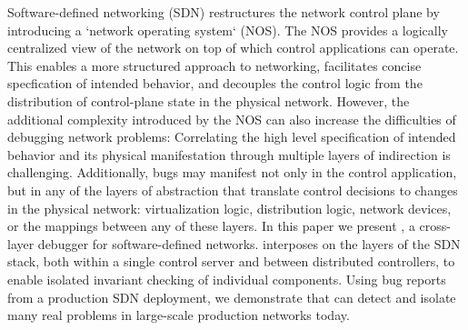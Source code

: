 Software-defined networking (SDN) restructures the network control plane
by introducing a `network operating system` (NOS). The NOS provides
a logically centralized view of the network on top of which control
applications can operate. This enables a more structured approach to
networking, facilitates concise specfication of intended behavior,
and decouples the control logic from the distribution of control-plane
state in the physical network.  However, the additional complexity
introduced by the NOS can also increase the difficulties of debugging
network problems: Correlating the high level specification
of intended behavior and its physical manifestation through multiple
layers of indirection is challenging. Additionally, bugs may manifest not only
in the control application, but in any of the layers of abstraction
that translate control decisions to changes in the physical network:
virtualization logic, distribution logic, network devices, or the mappings
between any of these layers. In this paper we present \projectname{},
a cross-layer debugger for software-defined networks. \projectname{}
interposes on the layers of the SDN stack, both within a single control
server and between distributed controllers, to enable isolated invariant
checking of individual components. Using bug reports from a production
SDN deployment, we demonstrate that \projectname{} can detect and isolate
many real problems in large-scale production networks today.
